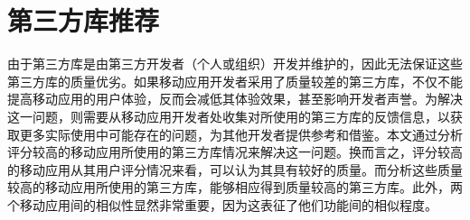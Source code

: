 \section{第三方库推荐}
由于第三方库是由第三方开发者（个人或组织）开发并维护的，因此无法保证这些第三方库的质量优劣。如果移动应用开发者采用了质量较差的第三方库，不仅不能提高移动应用的用户体验，反而会减低其体验效果，甚至影响开发者声誉。为解决这一问题，则需要从移动应用开发者处收集对所使用的第三方库的反馈信息，以获取更多实际使用中可能存在的问题，为其他开发者提供参考和借鉴。本文通过分析评分较高的移动应用所使用的第三方库情况来解决这一问题。换而言之，评分较高的移动应用从其用户评分情况来看，可以认为其具有较好的质量。而分析这些质量较高的移动应用所使用的第三方库，能够相应得到质量较高的第三方库。此外，两个移动应用间的相似性显然非常重要，因为这表征了他们功能间的相似程度。

